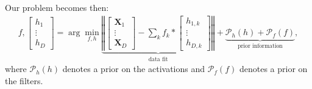 \documentclass[12pt, a4paper, twoside,draft]{article}
\begin{document}
Our problem becomes then:
\begin{align}
f, \left[ \begin{matrix}h_1 \\ \vdots \\ h_D \end{matrix} \right] = \arg \min_{f,h} \underbrace{\left\Vert \left[ \begin{matrix}\mathbf{X}_1 \\ \vdots \\ \mathbf{X}_D \end{matrix} \right] - \sum_k f_k \ast  \left[ \begin{matrix}h_{1,k} \\ \vdots \\ h_{D,k} \end{matrix} \right] \right\Vert }_{\textrm{data fit}} + \underbrace{\mathcal{P}_h(h) + \mathcal{P}_f(f) }_\textrm{prior information},
\end{align}
where $\mathcal{P}_h(h)$ denotes a prior on the activations and $\mathcal{P}_f(f)$ denotes a prior on the filters.
\end{document}
